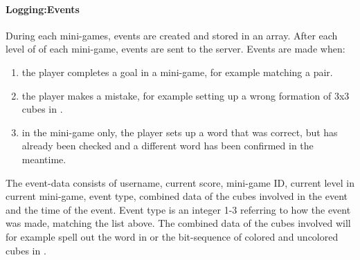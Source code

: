 \paragraph{Logging:Events}
During each mini-games, events are created and stored in an array. After each level of of each mini-game, events are sent to the server.
Events are made when:
\begin{enumerate}
	\item the player completes a goal in a mini-game, for example matching a pair.
	\item the player makes a mistake, for example setting up a wrong formation of 3x3 cubes in .
	\item in the  mini-game only, the player sets up a word that was correct, but has already been checked and a different word has been confirmed in the meantime.
\end{enumerate}
The event-data consists of username, current score, mini-game ID, current level in current mini-game, event type, combined data of the cubes involved in the event and the time of the event. 
Event type is an integer 1-3 referring to how the event was made, matching the list above. 
The combined data of the cubes involved will for example spell out the word in  or the bit-sequence of colored and uncolored cubes in .\\

